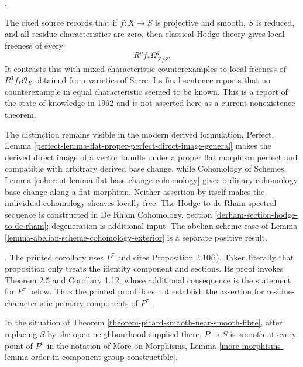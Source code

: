 \begin{remark}
\label{remark-hodge-cohomology-local-freeness-history}
\begin{reference}
\cite[Expos\'e 236, Remark 3.8, pp. 240--241]{FGA}.
\end{reference}
The cited source records that if $f : X \to S$ is projective and smooth,
$S$ is reduced, and all residue characteristics are zero, then classical
Hodge theory gives local freeness of every
$$
R^pf_*\Omega^q_{X/S}.
$$
It contrasts this with mixed-characteristic counterexamples to local
freeness of $R^1f_*\mathcal{O}_X$ obtained from varieties of Serre. Its final
sentence reports that no counterexample in equal characteristic seemed to be
known. This is a report of the state of knowledge in 1962 and is not asserted
here as a current nonexistence theorem.

The distinction remains visible in the modern derived formulation. Perfect,
Lemma \ref{perfect-lemma-flat-proper-perfect-direct-image-general} makes the
derived direct image of a vector bundle under a proper flat morphism perfect
and compatible with arbitrary derived base change, while Cohomology of
Schemes, Lemma \ref{coherent-lemma-flat-base-change-cohomology} gives ordinary
cohomology base change along a flat morphism. Neither assertion by itself
makes the individual cohomology sheaves locally free. The Hodge-to-de Rham
spectral sequence is constructed in De Rham Cohomology, Section
\ref{derham-section-hodge-to-de-rham}; degeneration is additional input. The
abelian-scheme case of Lemma
\ref{lemma-abelian-scheme-cohomology-exterior} is a separate positive result.
\end{remark}

\begin{lemma}
\label{corollary-picard-smooth-prime-to-characteristic-components}
\begin{reference}
\cite[Expos\'e 236, Corollary 3.8, p. 241]{FGA}. The printed corollary
uses $P^\tau$ and cites Proposition 2.10(i). Taken literally that proposition
only treats the identity component and sections. Its proof invokes
Theorem 2.5 and Corollary 1.12, whose additional consequence is the statement
for $P^\sigma$ below. Thus the printed proof does not establish the assertion
for residue-characteristic-primary components of $P^\tau$.
\end{reference}
In the situation of Theorem
\ref{theorem-picard-smooth-near-smooth-fibre}, after replacing $S$ by the
open neighbourhood supplied there, $P \to S$ is smooth at every point of
$P^\sigma$ in the notation of More on Morphisms, Lemma
\ref{more-morphisms-lemma-order-in-component-group-constructible}.
\end{lemma}

